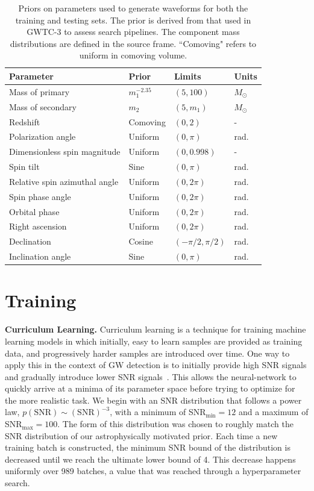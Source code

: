\begin{refsection}
\begin{table}
\centering
\footnotesize
\begin{tabular}{ p{3.9cm} p{3cm} p{3cm} p{3cm} }
\hline
\hline
Parameter & Prior & Limits & Units\\
\hline
Mass of primary & $m_1^{-2.35}$ & $(5, 100)$ & $M_{\odot}$\\
Mass of secondary & $m_2$ & $(5, m_1)$ & $M_{\odot}$\\
Redshift & Comoving & $(0, 2)$ & -\\
Polarization angle & Uniform & $(0, \pi)$ & rad.\\
Dimensionless spin magnitude & Uniform & $(0, 0.998)$ & -\\
Spin tilt & Sine & $(0, \pi)$ & rad.\\
Relative spin azimuthal angle & Uniform & $(0, 2\pi)$ & rad.\\
Spin phase angle & Uniform & $(0, 2\pi)$ & rad.\\
Orbital phase & Uniform & $(0, 2\pi)$ & rad.\\
Right ascension & Uniform & $(0, 2\pi)$ & rad.\\
Declination & Cosine & $(-\pi/2, \pi/2)$ & rad.\\
Inclination angle & Sine & $(0, \pi)$ & rad.\\
\hline
\hline
\end{tabular}
\caption[Priors on parameters used to generate waveforms for training and testing \aframe]{Priors on parameters used to generate waveforms for both the training and testing sets. The prior is derived from that used in GWTC-3 to assess search pipelines. The component mass distributions are defined in the source frame. ``Comoving" refers to uniform in comoving volume.}
\label{aframe_meth_tab:priors}
\end{table}

\section{Training}
\label{aframe_meth_sec:training}

\textbf{Curriculum Learning.}
Curriculum learning is a technique for training machine learning models in which initially, easy to learn samples are provided as training data, and progressively harder samples are introduced over time.
One way to apply this in the context of GW detection is to initially provide high SNR signals and gradually introduce lower SNR signals~\cite{nousi2022deep}.
This allows the neural-network to quickly arrive at a minima of its parameter space before trying to optimize for the more realistic task.
We begin with an SNR distribution that follows a power law, $p(\text{SNR}) \sim (\text{SNR})^{-3}$, with a minimum of SNR$_{\text{min}} = 12$ and a maximum of SNR$_{\text{max}} = 100$.
The form of this distribution was chosen to roughly match the SNR distribution of our astrophysically motivated prior. 
Each time a new training batch is constructed, the minimum SNR bound of the distribution is decreased until we reach the ultimate lower bound of 4.
This decrease happens uniformly over 989 batches, a value that was reached through a hyperparameter search. 



\end{refsection}
